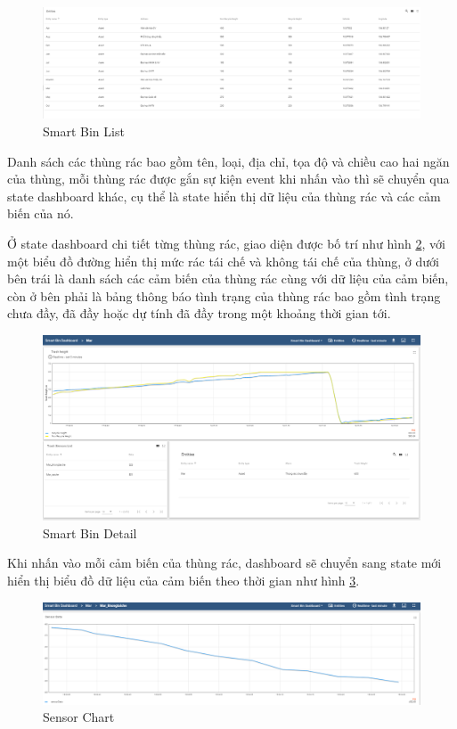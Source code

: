 \begin{figure}[H]
    \centering
    \includegraphics[width=\textwidth]{images/Khanh/Thingsboard/Dashboard_list.PNG}
    \caption{Smart Bin List}
    \label{fig:dashboard_asset_list}
\end{figure}
Danh sách các thùng rác bao gồm tên, loại, địa chỉ, tọa độ và chiều cao hai ngăn của thùng, mỗi thùng rác được gắn sự kiện event khi nhấn vào thì sẽ chuyển qua state dashboard khác, cụ thể là state hiển thị dữ liệu của thùng rác và các cảm biến của nó.

Ở state dashboard chi tiết từng thùng rác, giao diện được bố trí như hình \ref{fig:bin_detail}, với một biểu đồ đường hiển thị mức rác tái chế và không tái chế của thùng, ở dưới bên trái là danh sách các cảm biến của thùng rác cùng với dữ liệu của cảm biến, còn ở bên phải là bảng thông báo tình trạng của thùng rác bao gồm tình trạng chưa đầy, đã đầy hoặc dự tính đã đầy trong một khoảng thời gian tới. 
\begin{figure}[H]
    \centering
    \includegraphics[width=\textwidth]{images/Khanh/Thingsboard/Bin_detail.PNG}
    \caption{Smart Bin Detail}
    \label{fig:bin_detail}
\end{figure}

Khi nhấn vào mỗi cảm biến của thùng rác, dashboard sẽ chuyển sang state mới hiển thị biểu đồ dữ liệu của cảm biến theo thời gian như hình \ref{fig:sensor_detail}.
\begin{figure}[H]
    \centering
    \includegraphics[width=\textwidth]{images/Khanh/Thingsboard/Sensor_detail.PNG}
    \caption{Sensor Chart}
    \label{fig:sensor_detail}
\end{figure}